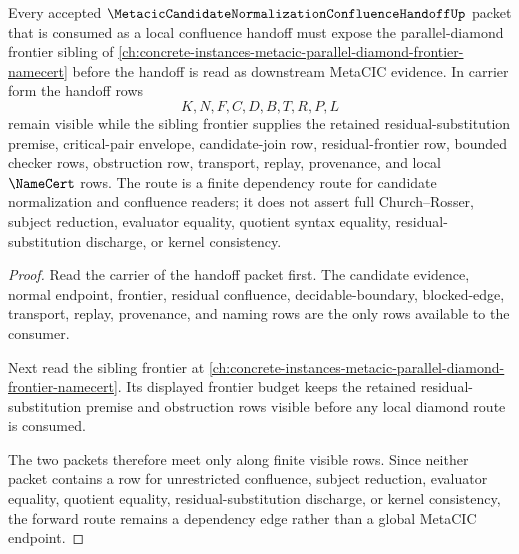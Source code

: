 \begin{theorem}
\label{thm:metacic-candidate-normalization-confluence-handoff-parallel-diamond-frontier-forward-route}
Every accepted $\MetacicCandidateNormalizationConfluenceHandoffUp$ packet that is consumed as a local confluence handoff must expose the parallel-diamond frontier sibling of \autoref{ch:concrete-instances-metacic-parallel-diamond-frontier-namecert} before the handoff is read as downstream MetaCIC evidence. In carrier form the handoff rows
$$
K,N,F,C,D,B,T,R,P,L
$$
remain visible while the sibling frontier supplies the retained residual-substitution premise, critical-pair envelope, candidate-join row, residual-frontier row, bounded checker rows, obstruction row, transport, replay, provenance, and local $\NameCert$ rows. The route is a finite dependency route for candidate normalization and confluence readers; it does not assert full Church--Rosser, subject reduction, evaluator equality, quotient syntax equality, residual-substitution discharge, or kernel consistency.
\end{theorem}
\begin{proof}
Read the carrier of the handoff packet first. The candidate evidence, normal endpoint, frontier, residual confluence, decidable-boundary, blocked-edge, transport, replay, provenance, and naming rows are the only rows available to the consumer.

Next read the sibling frontier at \autoref{ch:concrete-instances-metacic-parallel-diamond-frontier-namecert}. Its displayed frontier budget keeps the retained residual-substitution premise and obstruction rows visible before any local diamond route is consumed.

The two packets therefore meet only along finite visible rows. Since neither packet contains a row for unrestricted confluence, subject reduction, evaluator equality, quotient equality, residual-substitution discharge, or kernel consistency, the forward route remains a dependency edge rather than a global MetaCIC endpoint.
\end{proof}
